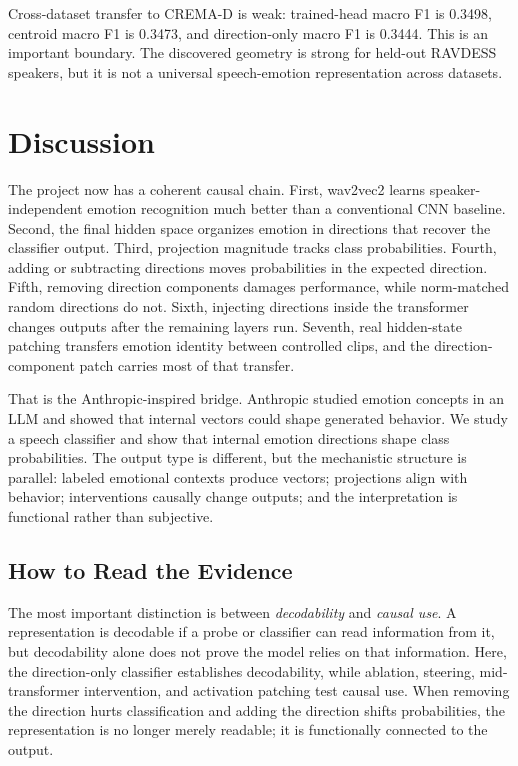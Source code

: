 \documentclass[conference]{IEEEtran}
\begin{document}
Cross-dataset transfer to CREMA-D \cite{cao2014cremad} is weak: trained-head macro F1 is 0.3498, centroid macro F1 is 0.3473, and direction-only macro F1 is 0.3444. This is an important boundary. The discovered geometry is strong for held-out RAVDESS speakers, but it is not a universal speech-emotion representation across datasets.

\section{Discussion}

The project now has a coherent causal chain. First, wav2vec2 learns speaker-independent emotion recognition much better than a conventional CNN baseline. Second, the final hidden space organizes emotion in directions that recover the classifier output. Third, projection magnitude tracks class probabilities. Fourth, adding or subtracting directions moves probabilities in the expected direction. Fifth, removing direction components damages performance, while norm-matched random directions do not. Sixth, injecting directions inside the transformer changes outputs after the remaining layers run. Seventh, real hidden-state patching transfers emotion identity between controlled clips, and the direction-component patch carries most of that transfer.

That is the Anthropic-inspired bridge. Anthropic studied emotion concepts in an LLM and showed that internal vectors could shape generated behavior. We study a speech classifier and show that internal emotion directions shape class probabilities. The output type is different, but the mechanistic structure is parallel: labeled emotional contexts produce vectors; projections align with behavior; interventions causally change outputs; and the interpretation is functional rather than subjective.

\subsection{How to Read the Evidence}

The most important distinction is between \emph{decodability} and \emph{causal use}. A representation is decodable if a probe or classifier can read information from it, but decodability alone does not prove the model relies on that information. Here, the direction-only classifier establishes decodability, while ablation, steering, mid-transformer intervention, and activation patching test causal use. When removing the direction hurts classification and adding the direction shifts probabilities, the representation is no longer merely readable; it is functionally connected to the output.
\end{document}

